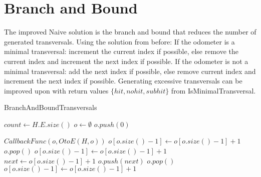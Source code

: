 \chapter{Branch and Bound}
The improved Naive solution is the branch and bound that reduces the number of generated transversals. Using the solution from before: If the odometer is a minimal transversal: increment the current index if possible, else remove the current index and increment the next index if possible. If the odometer is not a minimal transversal: add the next index if possible, else remove current index and increment the next index if possible. Generating excessive transversals can be improved upon with return values $\{hit,nohit,subhit\}$ from IsMinimalTransversal.
\begin{algorithm}
	\caption{BranchAndBoundTransversals}\label{BranchAndBoundTransversals}
	\begin{algorithmic}[1]
		\State $count \gets H.E.size()$
		\State $o \gets \emptyset$
		\State $o.push(0)$
		 {}
		
		\State $CallbackFunc(o,OtoE(H,o))$
		\State $o[o.size()-1] \gets o[o.size()-1] +1$
		\Else
		\State $o.pop()$
		\State $o[o.size()-1] \gets o[o.size()-1] +1 $
		\EndIf
		\EndIf
		\Else
		\State $next \gets o[o.size()-1] + 1$
		\State $o.push(next)$
		\Else
		\State $o.pop()$
		\State $o[o.size()-1] \gets o[o.size()-1] +1 $
		\EndIf
		\EndIf
		\EndIf
		\EndWhile
		\EndFunction
	\end{algorithmic}
\end{algorithm}